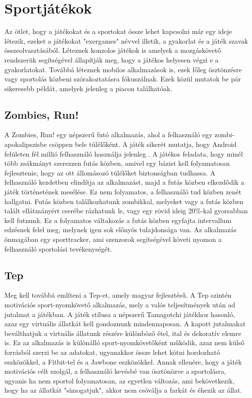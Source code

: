 \section{Sportjátékok}
\label{sportjatekok}

Az ötlet, hogy a játékokat és a sportokat össze lehet kapcsolni már egy ideje létezik, ezeket a játékokat "exergames" névvel illetik, a gyakorlat és a játék szavak összeolvasztásából. 
Léteznek konzolos játékok is amelyek a mozgáskövető rendszerük segítségével állapítják meg, hogy a játékos helyesen végzi e a gyakorlatokat. 
Továbbá léteznek mobilos alkalmazások is, ezek főleg ösztönzésre vagy sportolás közbeni szórakoztatásra fókuszálnak. 
Ezek közül mutatok be pár sikeresebb példát, amelyek jelenleg a piacon találhatóak. 

\subsection{Zombies, Run!}
\label{zombiesrun}

A Zombies, Run! egy népszerű futó alkalmazás, ahol a felhasználó egy zombi-apokalipszisbe csöppen bele túlélőként. 
A játék sikerét mutatja, hogy Android felületen fél millió felhasználó használja jelenleg \cite{zombiesrun}. 
A játékos feladata, hogy minél több zsákmányt szerezzen futás közben, amivel egy bázist kell folyamatosan fejlesztenie, hogy az ott állomásozó túlélőket biztonságban tudhassa. 
A felhasználó kezdetben elindítja az alkalmazást, majd a futás közben elkezdődik a játék történetének mesélése. 
Ez nem folyamatos, a felhasználó tud közben zenét hallgatni. 
Futás közben találkozhatunk zombikkal, melyeket vagy a futás közben talált ellátmányért cserébe rázhatunk le, vagy egy rövid ideig 20\%-kal gyorsabban kell futnunk. 
Ez a folyamatos váltakozás a futás közben egyfajta intervallum edzésnek felel meg, melynek igen sok előnyös tulajdonsága van. 
Az alkalmazás önmagában egy sporttracker, ami szenzorok segítségével követi nyomon a felhasználó sportolási tevékenységét.

\subsection{Tep}
\label{tep}

Meg kell továbbá említeni a Tep-et, amely magyar fejlesztésű. 
A Tep szintén motivációs sport-nyomkövető alkalmazás, mely a valós teljesítmények után ad jutalmat a játékban. 
A játék stílusa a népszerű Tamagotchi játékhoz hasonló, azaz egy virtuális állatkát kell gondoznunk mindennaposan. 
A kapott jutalmakat beválthatjuk a virtuális állatunk részére különböző étel, ital és dekoratív elemre is. 
Ez az alkalmazás is különálló sport-nyomkövetőként működik, azaz nem külső forrásból szerzi be az adatokat, ugyanakkor össze lehet kötni hordozható eszközökkel, a Fitbit-tel és a Jawbone eszközökkel. 
Annak ellenére, hogy a játék motivációs célt szolgál, a felhasználó kevésbé van ösztönözve a sportolásra, ugyanis ha nem sportol folyamatosan, az egyetlen változás, ami bekövetkezik, hogy ha az állatkát "simogatjuk", akkor nem csóválja a farkát és éhezik az állat. 

